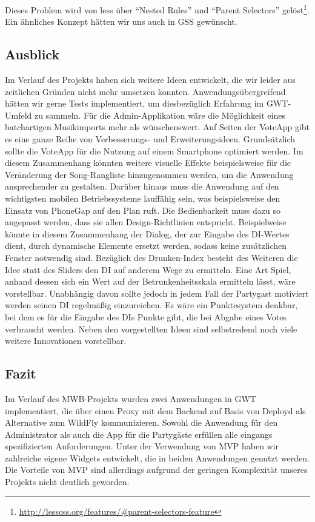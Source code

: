 Dieses Problem wird von less über "`Nested Rules"' und "`Parent Selectors"' gelöst\footnote{\url{http://lesscss.org/features/\#parent-selectors-feature}}. Ein ähnliches Konzept
hätten wir uns auch in GSS gewünscht.

\subsection{Ausblick}
Im Verlauf des Projekts haben sich weitere Ideen entwickelt, die wir leider aus zeitlichen Gründen nicht mehr umsetzen konnten. Anwendungsübergreifend hätten wir gerne Tests implementiert, um diesbezüglich Erfahrung im GWT-Umfeld zu sammeln. Für die Admin-Applikation wäre die Möglichkeit eines batchartigen Musikimports mehr als wünschenswert. Auf Seiten der VoteApp gibt es eine ganze Reihe von Verbesserungs- und Erweiterungsideen. Grundsätzlich sollte die VoteApp für die Nutzung auf einem Smartphone optimiert werden. Im diesem Zusammenhang könnten weitere visuelle Effekte beispielsweise für die Veränderung der Song-Rangliste hinzugenommen werden, um die Anwendung ansprechender zu gestalten. Darüber hinaus muss die Anwendung auf den wichtigsten mobilen Betriebssysteme lauffähig sein, was beispielsweise den Einsatz von PhoneGap auf den Plan ruft. Die Bedienbarkeit muss dazu so angepasst werden, dass sie allen Design-Richtlinien entspricht. Beispielweise könnte in diesem Zusammenhang der Dialog, der zur Eingabe des DI-Wertes dient, durch dynamische Elemente ersetzt werden, sodass keine zusätzlichen Fenster notwendig sind. Bezüglich des Drunken-Index besteht des Weiteren die Idee statt des Sliders den DI auf anderem Wege zu ermitteln. Eine Art Spiel, anhand dessen sich ein Wert auf der Betrunkenheitsskala ermitteln lässt, wäre vorstellbar. Unabhängig davon sollte jedoch in jedem Fall der Partygast motiviert werden seinen DI regelmäßig einzureichen. Es wäre ein Punktesystem denkbar, bei dem es für die Eingabe des DIs Punkte gibt, die bei Abgabe eines Votes verbraucht werden. Neben den vorgestellten Ideen sind selbstredend noch viele weitere Innovationen vorstellbar.

\subsection{Fazit}
Im Verlauf des MWB-Projekts wurden zwei Anwendungen in GWT implementiert, die über einen Proxy mit dem Backend auf Basis von Deployd als Alternative zum WildFly kommunizieren. Sowohl die Anwendung für den Administrator als auch die App für die Partygäste erfüllen alle eingangs spezifizierten Anforderungen. Unter der Verwendung von MVP haben wir zahlreiche eigene Widgets entwickelt, die in beiden Anwendungen genutzt werden. Die Vorteile von MVP sind allerdings aufgrund der geringen Komplexität unseres Projekts nicht deutlich geworden. 

